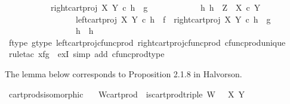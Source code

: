 \begin{isabellebody}
\ \ \ \ \ \ \ \ \ \ \ right{\isacharunderscore}{\kern0pt}cart{\isacharunderscore}{\kern0pt}proj\ X\ Y\ {\isasymcirc}\isactrlsub c\ h\ {\isacharequal}{\kern0pt}\ g\ {\isasymand}\isanewline
\ \ \ \ \ \ \ \ \ \ \ {\isacharparenleft}{\kern0pt}{\isasymforall}h{}{\isachardot}{\kern0pt}\ h{}\ {\isacharcolon}{\kern0pt}\ Z\ {\isasymrightarrow}\ X\ {\isasymtimes}\isactrlsub c\ Y\ {\isasymand}\isanewline
\ \ \ \ \ \ \ \ \ \ \ \ \ \ \ \ \ left{\isacharunderscore}{\kern0pt}cart{\isacharunderscore}{\kern0pt}proj\ X\ Y\ {\isasymcirc}\isactrlsub c\ h{}\ {\isacharequal}{\kern0pt}\ f\ {\isasymand}\ right{\isacharunderscore}{\kern0pt}cart{\isacharunderscore}{\kern0pt}proj\ X\ Y\ {\isasymcirc}\isactrlsub c\ h{}\ {\isacharequal}{\kern0pt}\ g\ {\isasymlongrightarrow}\isanewline
\ \ \ \ \ \ \ \ \ \ \ \ \ \ \ \ \ h{}\ {\isacharequal}{\kern0pt}\ h{\isacharparenright}{\kern0pt}{\isachardoublequoteclose}\isanewline
\ \ \ \ \ \ \ \isamarkupfalse%
\ f{\isacharunderscore}{\kern0pt}type\ g{\isacharunderscore}{\kern0pt}type\ left{\isacharunderscore}{\kern0pt}cart{\isacharunderscore}{\kern0pt}proj{\isacharunderscore}{\kern0pt}cfunc{\isacharunderscore}{\kern0pt}prod\ right{\isacharunderscore}{\kern0pt}cart{\isacharunderscore}{\kern0pt}proj{\isacharunderscore}{\kern0pt}cfunc{\isacharunderscore}{\kern0pt}prod\ cfunc{\isacharunderscore}{\kern0pt}prod{\isacharunderscore}{\kern0pt}unique\isanewline
\ \ \ \ \isamarkupfalse%
\ {\isacharparenleft}{\kern0pt}rule{\isacharunderscore}{\kern0pt}tac\ x{\isacharequal}{\kern0pt}{\isachardoublequoteopen}{\isasymlangle}f{\isacharcomma}{\kern0pt}g{\isasymrangle}{\isachardoublequoteclose}\ \ exI{\isacharcomma}{\kern0pt}\ simp\ add{\isacharcolon}{\kern0pt}\ cfunc{\isacharunderscore}{\kern0pt}prod{\isacharunderscore}{\kern0pt}type{\isacharparenright}{\kern0pt}\isanewline
{}\isamarkupfalse%
%
\endisatagproof
{\isafoldproof}%
%
\isadelimproof
%
\endisadelimproof
%
\begin{isamarkuptext}%
The lemma below corresponds to Proposition 2.1.8 in Halvorson.%
\end{isamarkuptext}\isamarkuptrue%
\isamarkupfalse%
\ cart{\isacharunderscore}{\kern0pt}prods{\isacharunderscore}{\kern0pt}isomorphic{\isacharcolon}{\kern0pt}\isanewline
\ \ \ W{\isacharunderscore}{\kern0pt}cart{\isacharunderscore}{\kern0pt}prod{\isacharcolon}{\kern0pt}\ \ {\isachardoublequoteopen}is{\isacharunderscore}{\kern0pt}cart{\isacharunderscore}{\kern0pt}prod{\isacharunderscore}{\kern0pt}triple\ {\isacharparenleft}{\kern0pt}W{\isacharcomma}{\kern0pt}\ {\isasympi}\ {\isasympi}\ X\ Y{\isachardoublequoteclose}\isanewline

\end{isabellebody}
